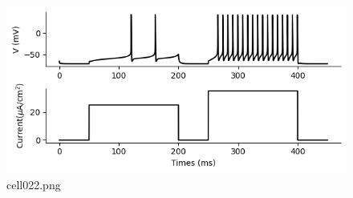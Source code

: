 \begin{figure}[ht]
	\centering
	\includegraphics[scale=0.8, max width=\linewidth]{./fig/neuron-model/hodgkin-huxley/cell022.png}
	\caption{cell022.png}
	\label{cell022.png}
\end{figure}